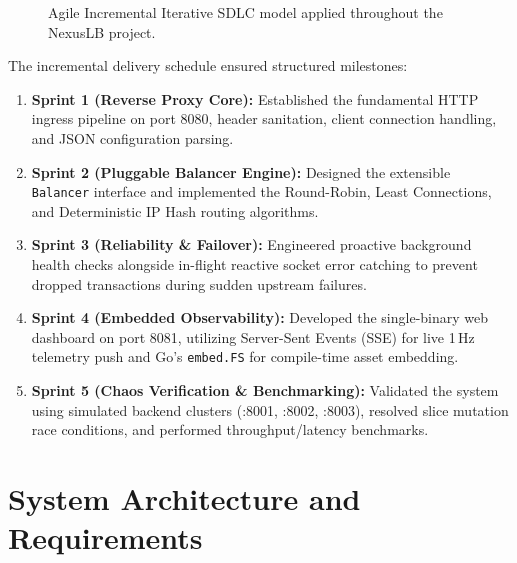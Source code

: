 \documentclass[12pt,openany]{report}
\begin{document}
\begin{figure}[H]
{%
}
\caption{Agile Incremental Iterative SDLC model applied throughout the NexusLB project.}
\label{fig:sdlc_diagram}
\end{figure}

The incremental delivery schedule ensured structured milestones:
\begin{enumerate}
  \item \textbf{Sprint 1 (Reverse Proxy Core):} Established the fundamental HTTP ingress pipeline on port 8080, header sanitation, client connection handling, and JSON configuration parsing.
  \item \textbf{Sprint 2 (Pluggable Balancer Engine):} Designed the extensible \texttt{Balancer} interface and implemented the Round-Robin, Least Connections, and Deterministic IP Hash routing algorithms.
  \item \textbf{Sprint 3 (Reliability \& Failover):} Engineered proactive background health checks alongside in-flight reactive socket error catching to prevent dropped transactions during sudden upstream failures.
  \item \textbf{Sprint 4 (Embedded Observability):} Developed the single-binary web dashboard on port 8081, utilizing Server-Sent Events (SSE) for live 1\,Hz telemetry push and Go's \texttt{embed.FS} for compile-time asset embedding.
  \item \textbf{Sprint 5 (Chaos Verification \& Benchmarking):} Validated the system using simulated backend clusters (:8001, :8002, :8003), resolved slice mutation race conditions, and performed throughput/latency benchmarks.
\end{enumerate}

\section{System Architecture and Requirements}
\end{document}
